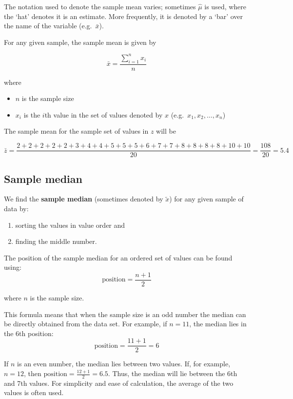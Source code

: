 \documentclass[
  oneside]{krantz}
\begin{document}
The notation used to denote the sample mean varies; sometimes \(\hat{\mu}\) is used, where the `hat' denotes it is an estimate. More frequently, it is denoted by a `bar' over the name of the variable (e.g.~\(\bar x\)).

For any given sample, the sample mean is given by

\[\bar x = \frac{\sum_{i=1}^{n} x_i}{n}\]

where

\begin{itemize}
\item
  \(n\) is the sample size
\item
  \(x_i\) is the \(i\)th value in the set of values denoted by \(x\) (e.g.~\(x_1, x_2, \ldots ,x_n\))
\end{itemize}

The sample mean for the sample set of values in \(z\) will be

\[ \bar z = \frac{2+2+2+2+2+3+4+4+5+5+5+6+7+7+8+8+8+8+10+10}{20} = \frac{108}{20}=5.4\]

\hypertarget{sample-median}{%
\subsection{Sample median}\label{sample-median}}

We find the \textbf{sample median} (sometimes denoted by \(\tilde{x}\)) for any given sample of data by:

\begin{enumerate}
\def\labelenumi{\arabic{enumi}.}
\item
  sorting the values in value order and
\item
  finding the middle number.
\end{enumerate}

The position of the sample median for an ordered set of values can be found using:
\[\textrm{position}=\frac{n+1}{2}\]

where \(n\) is the sample size.

This formula means that when the sample size is an odd number the median can be directly obtained from the data set. For example, if \(n=11\), the median lies in the 6th position:
\[\textrm{position} = \frac{11+1}2=6 \]

If \(n\) is an even number, the median lies between two values. If, for example, \(n=12\), then \(\textrm{position}=\frac{12+1}2=6.5\). Thus, the median will lie between the 6th and 7th values. For simplicity and ease of calculation, the average of the two values is often used.
\end{document}

